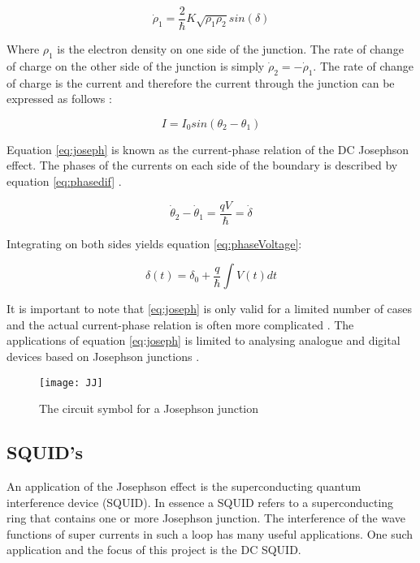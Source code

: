 \begin{equation}
    \dot\rho_1 = \frac{2}{\hbar}K\sqrt{\rho_1\rho_2}sin(\delta)
    \label{eq:charge_dens}
\end{equation}

Where $\rho_1$ is the electron density on one side of the junction. The rate of change of charge on the other side of the junction is simply $\dot\rho_2 = -\dot\rho_1$\cite{Feynman_Leighton_Sands_2013}. The rate of change of charge is the current and therefore the current through the junction can be expressed as follows \cite{CPRJJ}:

\begin{equation}
    I = I_0sin(\theta_2 - \theta_1)
    \label{eq:joseph}
\end{equation}

Equation \ref{eq:joseph} is known as the current-phase relation of the DC Josephson effect.
The phases of the currents on each side of the boundary is described by equation \ref{eq:phasedif} \cite{Feynman_Leighton_Sands_2013}.

\begin{equation}
    \dot\theta_2 - \dot\theta_1 = \frac{qV}{\hbar} = \dot\delta
    \label{eq:phasedif}
\end{equation}

Integrating on both sides yields equation \ref{eq:phaseVoltage}:

\begin{equation}
    \delta(t) = \delta_0 + \frac{q}{\hbar}\int V(t) dt
    \label{eq:phaseVoltage}
\end{equation}

It is important to note that \ref{eq:joseph} is only valid for a limited number of cases and the actual current-phase relation is often more complicated \cite{CPRJJ}. The applications of equation \ref{eq:joseph} is limited to analysing analogue and digital devices based on Josephson junctions \cite{CPRJJ}.

\begin{figure}[h]
    \centering
    \texttt{[image: JJ]}
    \label{fig:JJ}
    \caption{The circuit symbol for a Josephson junction}
\end{figure}


\subsection{SQUID's}
An application of the Josephson effect is the superconducting quantum interference device (SQUID). In essence a SQUID refers to a superconducting ring that contains one or more Josephson junction. The interference of the wave functions of super currents in such a loop has many useful applications. One such application and the focus of this project is the DC SQUID.

